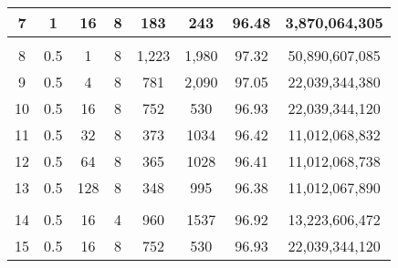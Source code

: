 \begin{table}[H]
\begin{tabular}{|c|c|c|c|c|c|c|c|}
        7                      & 1                     & 16                    & 8                     & 183                   & 243                   & 96.48                 & 3,870,064,305            \\
        \hline
        \multicolumn{1}{|l|}{} & \multicolumn{1}{l|}{} & \multicolumn{1}{l|}{} & \multicolumn{1}{l|}{} & \multicolumn{1}{l|}{} & \multicolumn{1}{l|}{} & \multicolumn{1}{l|}{} & \multicolumn{1}{l|}{}    \\
        \hline
        8                      & 0.5                   & 1                     & 8                     & 1,223                 & 1,980                 & 97.32                 & 50,890,607,085           \\
        9                      & 0.5                   & 4                     & 8                     & 781                   & 2,090                 & 97.05                 & 22,039,344,380           \\
        10                     & 0.5                   & 16                    & 8                     & 752                   & 530                   & 96.93                 & 22,039,344,120           \\
        11                     & 0.5                   & 32                    & 8                     & 373                   & 1034                  & 96.42                 & 11,012,068,832           \\
        12                     & 0.5                   & 64                    & 8                     & 365                   & 1028                  & 96.41                 & 11,012,068,738           \\
        13                     & 0.5                   & 128                   & 8                     & 348                   & 995                   & 96.38                 & 11,012,067,890           \\
        \hline
        \multicolumn{1}{|l|}{} & \multicolumn{1}{l|}{} & \multicolumn{1}{l|}{} & \multicolumn{1}{l|}{} & \multicolumn{1}{l|}{} & \multicolumn{1}{l|}{} & \multicolumn{1}{l|}{} & \multicolumn{1}{l|}{}    \\
        \hline
        14                     & 0.5                   & 16                    & 4                     & 960                   & 1537                  & 96.92                 & 13,223,606,472           \\
        15                     & 0.5                   & 16                    & 8                     & 752                   & 530                   & 96.93                 & 22,039,344,120           \\

\end{tabular}
\end{table}
